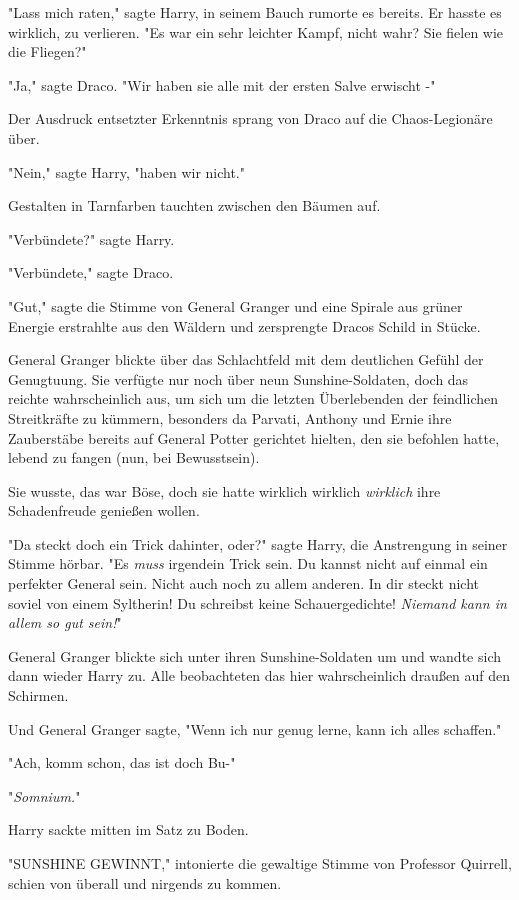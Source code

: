 {"Lass mich raten," sagte Harry, in seinem Bauch rumorte es bereits. Er hasste es wirklich, zu verlieren. "Es war ein sehr leichter Kampf, nicht wahr? Sie fielen wie die Fliegen?"

"Ja," sagte Draco. "Wir haben sie alle mit der ersten Salve erwischt -"

Der Ausdruck entsetzter Erkenntnis sprang von Draco auf die Chaos-Legionäre über.

"Nein," sagte Harry, "haben wir nicht."

Gestalten in Tarnfarben tauchten zwischen den Bäumen auf.

"Verbündete?" sagte Harry.

"Verbündete," sagte Draco.

"Gut," sagte die Stimme von General Granger und eine Spirale aus grüner Energie erstrahlte aus den Wäldern und zersprengte Dracos Schild in Stücke.

\later

General Granger blickte über das Schlachtfeld mit dem deutlichen Gefühl der Genugtuung. Sie verfügte nur noch über neun Sunshine-Soldaten, doch das reichte wahrscheinlich aus, um sich um die letzten Überlebenden der feindlichen Streitkräfte zu kümmern, besonders da Parvati, Anthony und Ernie ihre Zauberstäbe bereits auf General Potter gerichtet hielten, den sie befohlen hatte, lebend zu fangen (nun, bei Bewusstsein).

Sie wusste, das war Böse, doch sie hatte wirklich wirklich \emph{wirklich} ihre Schadenfreude genießen wollen.

"Da steckt doch ein Trick dahinter, oder?" sagte Harry, die Anstrengung in seiner Stimme hörbar. "Es \emph{muss} irgendein Trick sein. Du kannst nicht auf einmal ein perfekter General sein. Nicht auch noch zu allem anderen. In dir steckt nicht soviel von einem Syltherin! Du schreibst keine Schauergedichte! \emph{Niemand kann in allem so gut sein!}"

General Granger blickte sich unter ihren Sunshine-Soldaten um und wandte sich dann wieder Harry zu. Alle beobachteten das hier wahrscheinlich draußen auf den Schirmen.

Und General Granger sagte, "Wenn ich nur genug lerne, kann ich alles schaffen."

"Ach, komm schon, das ist doch Bu-"

"\emph{Somnium.}"

Harry sackte mitten im Satz zu Boden.

"SUNSHINE GEWINNT," intonierte die gewaltige Stimme von Professor Quirrell, schien von überall und nirgends zu kommen.

}

